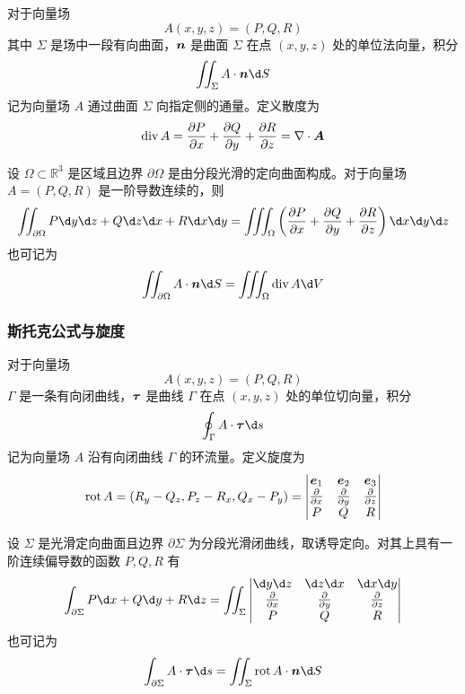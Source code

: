对于向量场
\[ A(x, y, z) = (P, Q, R) \]
其中 $\Sigma$ 是场中一段有向曲面，$\boldsymbol{n}$ 是曲面 $\Sigma$ 在点 $(x, y, z)$ 处的单位法向量，积分
\[ \iint_{\Sigma} A \cdot \vbf{n} \d S  \]
记为向量场 $A$ 通过曲面 $\Sigma$ 向指定侧的通量。定义散度为
\[ \operatorname{div} A = \frac{\partial P}{\partial x} + \frac{\partial Q}{\partial y} + \frac{\partial R}{\partial z} = \nabla \cdot \boldsymbol{A} \]

\begin{theorem}[Gauss 公式]
	设 $\Omega \subset \mathbb{R}^3$ 是区域且边界 $\partial \Omega$ 是由分段光滑的定向曲面构成。对于向量场 $A = (P, Q, R)$ 是一阶导数连续的，则
	\[ \iint_{\partial \Omega} P \d y \d z + Q \d z \d x + R \d x \d y = \iiint_{\Omega} \left( \frac{\partial P}{\partial x} + \frac{\partial Q}{\partial y} + \frac{\partial R}{\partial z} \right) \d x \d y \d z \]
	也可记为
	\[ \iint_{\partial \Omega} A \cdot \vbf{n} \d S = \iiint_{\Omega} \operatorname{div} A \d V \]
\end{theorem}

\subsubsection*{斯托克公式与旋度}

对于向量场
\[ A(x, y, z) = (P, Q, R) \]
$\Gamma$ 是一条有向闭曲线，$\boldsymbol{\tau}$ 是曲线 $\Gamma$ 在点 $(x, y, z)$ 处的单位切向量，积分
\[ \oint_{\Gamma} A \cdot \vbf{\tau} \d s  \]
记为向量场 $A$ 沿有向闭曲线 $\Gamma$ 的环流量。定义旋度为
\[ \operatorname{rot} A = \left(R_y - Q_z, P_z - R_x, Q_x - P_y \right) = \left| \begin{matrix}
		\boldsymbol{e}_1                   & \boldsymbol{e}_2                   & \boldsymbol{e}_3                   \\
		\frac{\partial}{\partial x} & \frac{\partial}{\partial y} & \frac{\partial}{\partial z} \\
		P                           & Q                           & R
	\end{matrix} \right| \]

\begin{theorem}[Stokes 公式]
	设 $\Sigma$ 是光滑定向曲面且边界 $\partial \Sigma$ 为分段光滑闭曲线，取诱导定向。对其上具有一阶连续偏导数的函数 $P, Q, R$ 有
	\[ \int_{\partial \Sigma} P \d x + Q \d y + R \d z = \iint_\Sigma \left| \begin{matrix}
			\d y \d z                   & \d z \d x                   & \d x \d y                   \\
			\frac{\partial}{\partial x} & \frac{\partial}{\partial y} & \frac{\partial}{\partial z} \\
			P                           & Q                           & R
		\end{matrix} \right| \]
	也可记为
	\[ \int_{\partial \Sigma} A \cdot \vbf{\tau} \d s = \iint_\Sigma \operatorname{rot} A \cdot \vbf{n} \d S \]
\end{theorem}

